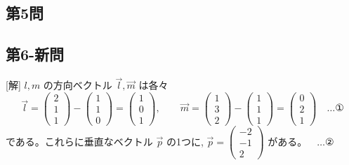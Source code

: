\documentclass[../main.tex]{subfiles}
\begin{document}
\newpage

\subsection*{第5問}


\newpage

\subsection*{第6-新問}

[解] $l, m$ の方向ベクトル $\vec{l}, \vec{m}$ は各々
\[
  \vec{l} =
  \begin{pmatrix} 2 \\ 1 \\ 1
  \end{pmatrix} -
  \begin{pmatrix} 1 \\ 1 \\ 0
  \end{pmatrix} =
  \begin{pmatrix} 1 \\ 0 \\ 1
  \end{pmatrix}, \qquad
  \vec{m} =
  \begin{pmatrix} 1 \\ 3 \\ 2
  \end{pmatrix} -
  \begin{pmatrix} 1 \\ 1 \\ 1
  \end{pmatrix} =
  \begin{pmatrix} 0 \\ 2 \\ 1
  \end{pmatrix} \quad \dots \text{①}
\]
である。これらに垂直なベクトル $\vec{p}$ の1つに, $\vec{p} =
\begin{pmatrix} -2 \\ -1 \\ 2
\end{pmatrix}$ がある。$\quad \dots \text{②}$
\end{document}
